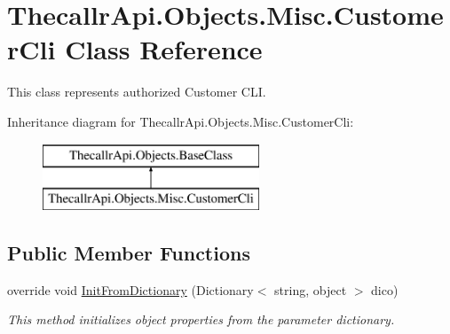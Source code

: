 \hypertarget{class_thecallr_api_1_1_objects_1_1_misc_1_1_customer_cli}{\section{Thecallr\+Api.\+Objects.\+Misc.\+Customer\+Cli Class Reference}
\label{class_thecallr_api_1_1_objects_1_1_misc_1_1_customer_cli}
}


This class represents authorized Customer C\+L\+I.  


Inheritance diagram for Thecallr\+Api.\+Objects.\+Misc.\+Customer\+Cli\+:\begin{figure}[H]
\begin{center}
\leavevmode
\includegraphics[height=2.000000cm]{class_thecallr_api_1_1_objects_1_1_misc_1_1_customer_cli}
\end{center}
\end{figure}
\subsection*{Public Member Functions}
\begin{DoxyCompactItemize}
\item 
override void \hyperlink{class_thecallr_api_1_1_objects_1_1_misc_1_1_customer_cli_a37072f4b63f9fb1d72bf2e63c94dcd16}{Init\+From\+Dictionary} (Dictionary$<$ string, object $>$ dico)
\begin{DoxyCompactList}\small\item\em This method initializes object properties from the parameter dictionary. \end{DoxyCompactList}\end{DoxyCompactItemize}

